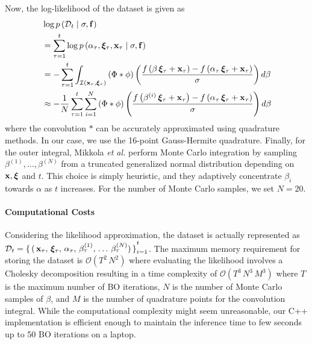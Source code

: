 Now, the log-likelihood of the dataset is given as
{\small
\begin{align}
  &\log p\left(\mathcal{D}_t \mid \sigma, \mathbf{f} \right) \\
  &= \sum_{\tau=1}^{t} \log p\left(\alpha_{\tau}, \bm{\xi}_{\tau}, \mathbf{x}_{\tau} \mid \sigma, \mathbf{f} \right) \\
  &= -\sum_{\tau=1}^{t} \int_{\mathcal{I}\left(\mathbf{x}_{\tau}, \bm{\xi}_{\tau}\right)} \left(\Phi * \phi \right) \left( \frac{ f\left(\beta \, \bm{\xi}_{\tau} + \mathbf{x}_{\tau} \right) - f\left(\alpha_{\tau} \, \bm{\xi}_{\tau} + \mathbf{x}_{\tau} \right) }{\sigma} \right) d\beta \\
  &\approx -\frac{1}{N}  \sum_{\tau=1}^{t} \sum_{i=1}^N \left(\Phi * \phi \right) \left( \frac{ f\left(\beta^{(i)} \, \bm{\xi}_{\tau} + \mathbf{x}_{\tau} \right) - f\left(\alpha_{\tau} \, \bm{\xi}_{\tau} + \mathbf{x}_{\tau} \right) }{\sigma} \right) d\beta
\end{align}
}%
{\noindent}where the convolution \(*\) can be accurately approximated using quadrature methods.
In our case, we use the 16-point Gauss-Hermite quadrature.
Finally, for the outer integral, Mikkola \textit{et al.} perform Monte Carlo integration by sampling \(\beta^{(1)}, \ldots, \beta^{(N)} \) from a truncated generalized normal distribution depending on \(\mathbf{x}, \bm{\xi}\) and \(t\).
This choice is simply heuristic, and they adaptively concentrate \(\beta_i\) towards \(\alpha\) as \(t\) increases.
For the number of Monte Carlo samples, we set \(N=20\).

\paragraph{Computational Costs}
Considering the likelihood approximation, the dataset is actually represented as \(\mathcal{D}_{t} = {\{\,(\,\mathbf{x}_{\tau},\, \bm{\xi}_{\tau},\, \alpha_{\tau},\, \beta^{(1)}_{\tau},\, \ldots\, \beta^{(N)}_{\tau})\,\}}_{i=1}^{t}\).
The maximum memory requirement for storing the dataset is \(\mathcal{O}\left( T^2 \, N^2  \right)\) where evaluating the likelihood involves a Cholesky decomposition resulting in a time complexity of \(\mathcal{O}\left( T^3 \, N^3 \, M^3  \right)\) where \(T\) is the maximum number of BO iterations, \(N\) is the number of Monte Carlo samples of \(\beta\), and \(M\) is the number of quadrature points for the convolution integral.
While the computational complexity might seem unreasonable, our C++ implementation is efficient enough to maintain the inference time to few seconds up to 50 BO iterations on a laptop.

